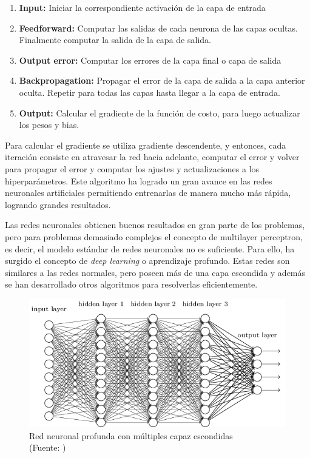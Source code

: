 \begin{enumerate}
\item \textbf{Input:} Iniciar la correspondiente activación de la capa de entrada

\item \textbf{Feedforward:} Computar las salidas de cada neurona de las capas ocultas. Finalmente computar la salida de la capa de salida.

\item \textbf{Output error:} Computar los errores de la capa final o capa de salida

\item \textbf{Backpropagation:} Propagar el error de la capa de salida a la capa anterior oculta. Repetir para todas las capas hasta llegar a la capa de entrada.

\item \textbf{Output:} Calcular el gradiente de la función de costo, para luego actualizar los pesos y bias.

\end{enumerate}

Para calcular el gradiente se utiliza gradiente descendente, y entonces, cada iteración consiste en atravesar la red hacia adelante, computar el error y volver para propagar el error y computar los ajustes y actualizaciones a los hiperparámetros. Este algoritmo ha logrado un gran avance en las redes neuronales artificiales permitiendo entrenarlas de manera mucho más rápida, logrando grandes resultados.

Las redes neuronales obtienen buenos resultados en gran parte de los problemas, pero para problemas demasiado complejos el concepto de multilayer perceptron, es decir, el modelo estándar de redes neuronales no es suficiente. Para ello, ha surgido el concepto de \textit{deep learning} o aprendizaje profundo. Estas redes son similares a las redes normales, pero poseen más de una capa escondida y además se han desarrollado otros algoritmos para resolverlas eficientemente. 

\begin{figure}[ht!]
\centering
\includegraphics[width=.6\textwidth]{figures/deep.png}
\caption[Redes neuronales profundas]{Red neuronal profunda con múltiples capaz escondidas\\
{\scriptsize (Fuente: \cite{slp})}}
\label{fig:mlp}
\end{figure}

